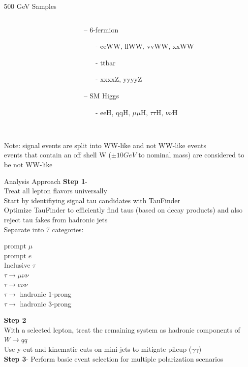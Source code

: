 \documentclass[10pt]{beamer}
\begin{document}
\begin{frame}{500 GeV Samples}
\begin{columns}
\begin{column}{0.5\textwidth}
\end{column}
\begin{column}{0.5\textwidth}
\begin{itemize}
	\item[--] 6-fermion
	\begin{itemize}
		\scriptsize
		\item[-]eeWW, llWW, vvWW, xxWW
		\item[-]ttbar
		\item[-]xxxxZ, yyyyZ
	\end{itemize}
	\item[--] SM Higgs
		\begin{itemize}
			\scriptsize
			\item[-] eeH, qqH, $\mu\mu$H, $\tau\tau$H, $\nu\nu$H
		\end{itemize}\quad\quad
\end{itemize}
\end{column}
\end{columns}
\quad \quad \\
\scriptsize
Note: signal events are split into WW-like and not WW-like events\\
events that contain an off shell W ($\pm 10 GeV$ to nominal mass) are considered to be not WW-like

\end{frame}

\begin{frame}{Analysis Approach}
\textbf{Step 1}-\\
Treat all lepton flavors universally\\
Start by identifiying signal tau candidates with TauFinder\\
\scriptsize
\quad	Optimize TauFinder to efficiently find taus (based on decay products) and also reject tau fakes from hadronic jets\\
\quad \quad	\quad Separate into 7 categories:\\
\begin{center}		
		prompt $\mu$\\
		prompt $e$\\
		Inclusive $\tau$\\
		$\tau\rightarrow \mu \nu \nu$ \\
		$\tau\rightarrow e \nu \nu$\\
		$\tau \rightarrow$ hadronic 1-prong\\
		$\tau \rightarrow$ hadronic 3-prong\\
\end{center}
\quad \quad \quad	%
	\normalsize
\textbf{Step 2}-\\
With a selected lepton, treat the remaining system as hadronic components of $W\rightarrow qq$\\
\quad \quad \scriptsize Use y-cut and kinematic cuts on mini-jets to mitigate pileup ($\gamma \gamma$)\\
\normalsize
\textbf{Step 3}- Perform basic event selection for multiple polarization scenarios\\
\end{frame}
\end{document}
